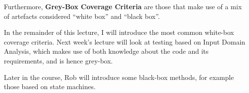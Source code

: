 
Furthermore, {\bf Grey-Box Coverage Criteria} are those that make use of a mix of
artefacts considered ``white box'' and ``black box''. 

In the remainder of this lecture, I will introduce the most common white-box
coverage criteria. Next week's lecture will look at testing based on Input
Domain Analysis, which makes use of both knowledge about the code and its
requirements, and is hence grey-box.

Later in the course, Rob will introduce some black-box methods, for example those
based on state machines.


